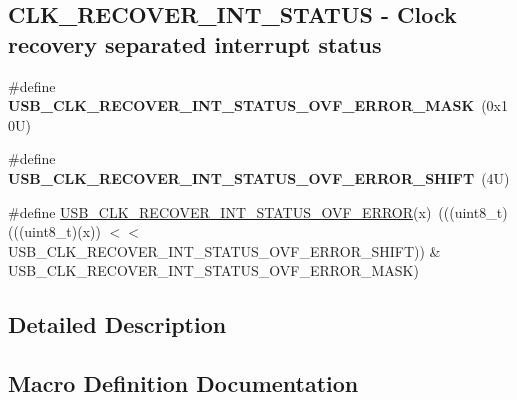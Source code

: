 \subsection*{C\+L\+K\+\_\+\+R\+E\+C\+O\+V\+E\+R\+\_\+\+I\+N\+T\+\_\+\+S\+T\+A\+T\+US -\/ Clock recovery separated interrupt status}
\begin{DoxyCompactItemize}
\item 
\mbox{\label{group___u_s_b___register___masks_ga159e6afded3ea1fd5360f35010beef77}} 
\#define {\bfseries U\+S\+B\+\_\+\+C\+L\+K\+\_\+\+R\+E\+C\+O\+V\+E\+R\+\_\+\+I\+N\+T\+\_\+\+S\+T\+A\+T\+U\+S\+\_\+\+O\+V\+F\+\_\+\+E\+R\+R\+O\+R\+\_\+\+M\+A\+SK}~(0x10\+U)
\item 
\mbox{\label{group___u_s_b___register___masks_gad67bead4d081f4a50deb6bc8e024ffc7}} 
\#define {\bfseries U\+S\+B\+\_\+\+C\+L\+K\+\_\+\+R\+E\+C\+O\+V\+E\+R\+\_\+\+I\+N\+T\+\_\+\+S\+T\+A\+T\+U\+S\+\_\+\+O\+V\+F\+\_\+\+E\+R\+R\+O\+R\+\_\+\+S\+H\+I\+FT}~(4\+U)
\item 
\#define \mbox{\hyperlink{group___u_s_b___register___masks_ga24f0317159c6d0686ee348c7579fbadf}{U\+S\+B\+\_\+\+C\+L\+K\+\_\+\+R\+E\+C\+O\+V\+E\+R\+\_\+\+I\+N\+T\+\_\+\+S\+T\+A\+T\+U\+S\+\_\+\+O\+V\+F\+\_\+\+E\+R\+R\+OR}}(x)~(((uint8\+\_\+t)(((uint8\+\_\+t)(x)) $<$$<$ U\+S\+B\+\_\+\+C\+L\+K\+\_\+\+R\+E\+C\+O\+V\+E\+R\+\_\+\+I\+N\+T\+\_\+\+S\+T\+A\+T\+U\+S\+\_\+\+O\+V\+F\+\_\+\+E\+R\+R\+O\+R\+\_\+\+S\+H\+I\+FT)) \& U\+S\+B\+\_\+\+C\+L\+K\+\_\+\+R\+E\+C\+O\+V\+E\+R\+\_\+\+I\+N\+T\+\_\+\+S\+T\+A\+T\+U\+S\+\_\+\+O\+V\+F\+\_\+\+E\+R\+R\+O\+R\+\_\+\+M\+A\+SK)
\end{DoxyCompactItemize}


\subsection{Detailed Description}


\subsection{Macro Definition Documentation}
\mbox{\label{group___u_s_b___register___masks_gad42e50014eedee91315521b19199ef39}} 
